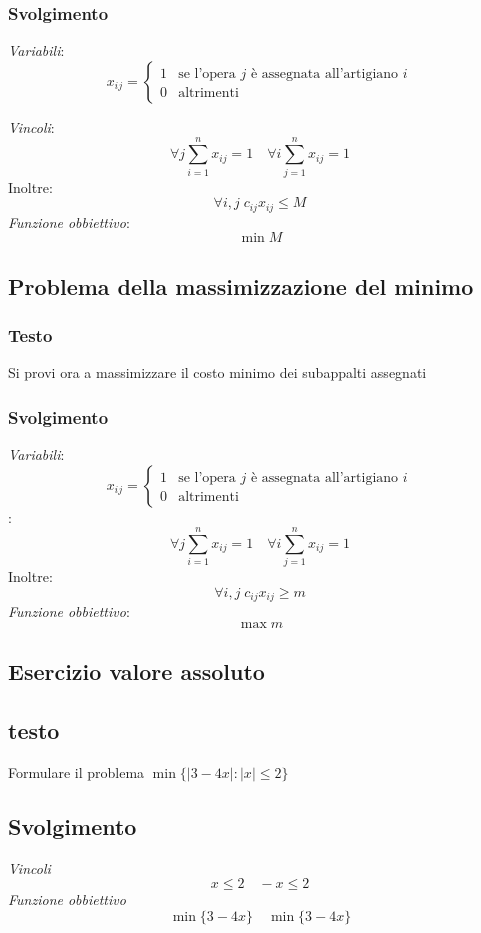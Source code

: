 \subsubsection{Svolgimento}
\textit{Variabili}:
\[
    x_{ij} = \begin{cases}
        1 & \text{se l'opera $j$ è assegnata all'artigiano $i$}\\
        0 & \text{altrimenti}
    \end{cases}
\]

\textit{Vincoli}:
\[
    \forall j \sum^n_{i=1}x_{ij}=1 \quad \forall i \sum_{j=1}^n x_{ij}=1 
\]
Inoltre: 
\[
    \forall i, j\; c_{ij}x_{ij}\leq M
\]
\textit{Funzione obbiettivo}:
\[
    \min M
\]

\subsection{Problema della massimizzazione del minimo}
\subsubsection{Testo}
Si provi ora a massimizzare il costo minimo dei subappalti assegnati
\subsubsection{Svolgimento}
\textit{Variabili}:
\[
    x_{ij} = \begin{cases}
        1 & \text{se l'opera $j$ è assegnata all'artigiano $i$}\\
        0 & \text{altrimenti}
    \end{cases}
\]
:
\[
    \forall j \sum^n_{i=1}x_{ij}=1 \quad \forall i \sum_{j=1}^n x_{ij}=1
\]
Inoltre:
\[
    \forall i, j\; c_{ij}x_{ij}\geq m
\]
\textit{Funzione obbiettivo}:
\[
    \max m
\]

\subsection{Esercizio valore assoluto}
\subsection{testo}
Formulare il problema $\min\{|3 - 4x| : |x| \leq 2\}$
\subsection{Svolgimento}
\textit{Vincoli}
\[
    x \leq 2 \quad -x\leq 2
\]
\textit{Funzione obbiettivo}
\[
    \min\{3-4x\} \quad \min\{3-4x\}
\]